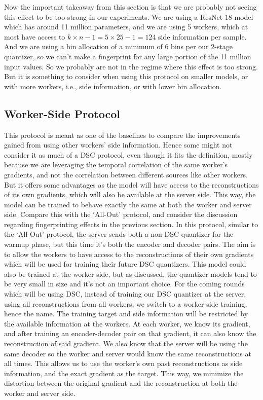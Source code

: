 Now the important takeaway from this section is that we are probably not seeing this effect to be too strong in our experiments. We are using a ResNet-18 model which has around 11 million parameters, and we are using 5 workers, which at most have access to $k \times n - 1 = 5 \times 25 - 1 = 124$ side information per sample. And we are using a bin allocation of a minimum of 6 bins per our 2-stage quantizer, so we can't make a fingerprint for any large portion of the 11 million input values. So we probably are not in the regime where this effect is too strong. But it is something to consider when using this protocol on smaller models, or with more workers, i.e., side information, or with lower bin allocation.

\subsection{Worker-Side Protocol}
This protocol is meant as one of the baselines to compare the improvements gained from using other workers' side information. Hence some might not consider it as much of a DSC protocol, even though it fits the definition, mostly because we are leveraging the temporal correlation of the same worker's gradients, and not the correlation between different sources like other workers. But it offers some advantages as the model will have access to the reconstructions of its own gradients, which will also be available at the server side. This way, the model can be trained to behave exactly the same at both the worker and server side. Compare this with the `All-Out' protocol, and consider the discussion regarding fingerprinting effects in the previous section.
In this protocol, similar to the `All-Out' protocol, the server sends both a non-DSC quantizer for the warmup phase, but this time it's both the encoder and decoder pairs. The aim is to allow the workers to have access to the reconstructions of their own gradients which will be used for training their future DSC quantizers. This model could also be trained at the worker side, but as discussed, the quantizer models tend to be very small in size and it's not an important choice.
For the coming rounds which will be using DSC, instead of training our DSC quantizer at the server, using all reconstructions from all workers, we switch to a worker-side training, hence the name. The training target and side information will be restricted by the available information at the workers. At each worker, we know its gradient, and after training an encoder-decoder pair on that gradient, it can also know the reconstruction of said gradient. We also know that the server will be using the same decoder so the worker and server would know the same reconstructions at all times. This allows us to use the worker's own past reconstructions as side information, and the exact gradient as the target. This way, we minimize the distortion between the original gradient and the reconstruction at both the worker and server side.
